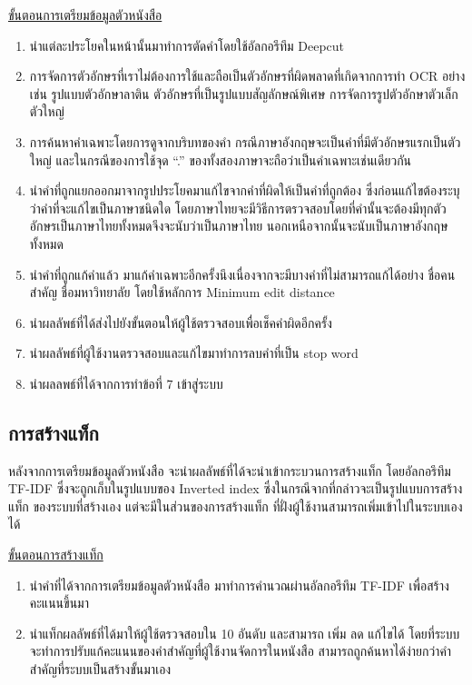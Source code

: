 \underline{ขั้นตอนการเตรียมข้อมูลตัวหนังสือ}
\begin{enumerate}
    \item นำแต่ละประโยคในหน้านั้นมาทำการตัดคำโดยใช้อัลกอรึทึม Deepcut
    \item การจัดการตัวอักษรที่เราไม่ต้องการใช้และถือเป็นตัวอักษรที่ผิดพลาดที่เกิดจากการทำ OCR อย่างเช่น รูปแบบตัวอักษาลาติน ตัวอักษรที่เป็นรูปแบบสัญลักษณ์พิเศษ การจัดการรูปตัวอักษาตัวเล็กตัวใหญ่
    \item การค้นหาคำเฉพาะโดยการดูจากบริบทของคำ กรณีภาษาอังกฤษจะเป็นคำที่มีตัวอักษรแรกเป็นตัวใหญ่ และในกรณีของการใช้จุด “.” ของทั้งสองภาษาจะถือว่าเป็นคำเฉพาะเช่นเดียวกัน
    \item นำคำที่ถูกแยกออกมาจากรูปประโยคมาแก้ไขจากคำที่ผิดให้เป็นคำที่ถูกต้อง ซึ่งก่อนแก้ไขต้องระบุว่าคำที่จะแก้ไขเป็นภาษาชนิดใด โดยภาษาไทยจะมีวิธีการตรวจสอบโดยที่คำนั้นจะต้องมีทุกตัวอักษรเป็นภาษาไทยทั้งหมดจึงจะนับว่าเป็นภาษาไทย นอกเหนือจากนั้นจะนับเป็นภาษาอังกฤษทั้งหมด
    \item นำคำที่ถูกแก้คำแล้ว มาแก้คำเฉพาะอีกครั้งนึงเนื่องจากจะมีบางคำที่ไม่สามารถแก้ได้อย่าง ชื่อคนสำคัญ ชื่อมหาวิทยาลัย โดยใช้หลักการ Minimum edit distance
    \item นำผลลัพธ์ที่ได้ส่งไปยังขั้นตอนให้ผู้ใช้ตรวจสอบเพื่อเช็คคำผิดอีกครั้ง
    \item นำผลลัพธ์ที่ผู้ใช้งานตรวจสอบและแก้ไขมาทำการลบคำที่เป็น stop word
    \item นำผลลพธ์ที่ได้จากการทำข้อที่ 7 เข้าสู่ระบบ

\end{enumerate}

\subsection{การสร้างแท็ก}

หลังจากการเตรียมข้อมูลตัวหนังสือ จะนำผลลัพธ์ที่ได้จะนำเข้ากระบวนการสร้างแท็ก โดยอัลกอรึทึม TF-IDF ซึ่งจะถูกเก็บในรูปแบบของ Inverted index ซึ่งในกรณีจากที่กล่าวจะเป็นรูปแบบการสร้างแท็ก ของระบบที่สร้างเอง แต่จะมีในส่วนของการสร้างแท็ก ที่ฝั่งผู้ใช้งานสามารถเพิ่มเข้าไปในระบบเองได้

\underline{ขั้นตอนการสร้างแท็ก}
\begin{enumerate}
    \item นำคำที่ได้จากการเตรียมข้อมูลตัวหนังสือ มาทำการคำนวณผ่านอัลกอรึทึม TF-IDF เพื่อสร้างคะแนนขึ้นมา
    \item นำแท็กผลลัพธ์ที่ได้มาให้ผู้ใช้ตรวจสอบใน 10 อันดับ และสามารถ เพิ่ม ลด แก้ไขได้ โดยที่ระบบจะทำการปรับแก้คะแนนของคำสำคัญที่ผู้ใช้งานจัดการในหนังสือ สามารถถูกค้นหาได้ง่ายกว่าคำสำคัญที่ระบบเป็นสร้างขั้นมาเอง
    
\end{enumerate}

